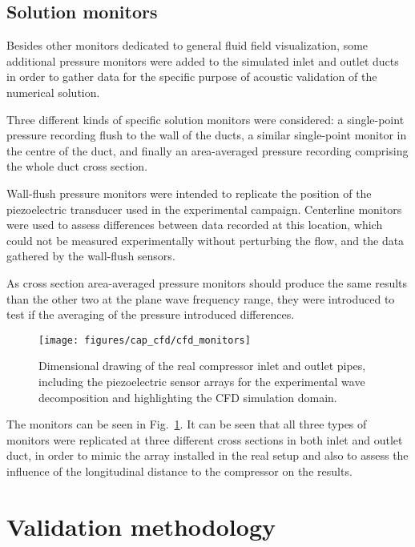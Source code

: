 \subsection{Solution monitors}\label{sub:cfd_sol_monitors}

Besides other monitors dedicated to general fluid field visualization, some additional pressure monitors were added to the simulated inlet and outlet ducts in order to gather data for the specific purpose of acoustic validation of the numerical solution.

Three different kinds of specific solution monitors were considered: a single-point pressure recording flush to the wall of the ducts, a similar single-point monitor in the centre of the duct, and finally an area-averaged pressure recording comprising the whole duct cross section. 

Wall-flush pressure monitors were intended to replicate the position of the piezoelectric transducer used in the experimental campaign. Centerline monitors were used to assess differences between data recorded at this location, which could not be measured experimentally without perturbing the flow, and the data gathered by the wall-flush sensors. 

As cross section area-averaged pressure monitors should produce the same results than the other two at the plane wave frequency range, they were introduced to test if the averaging of the pressure introduced differences.

\begin{figure}
\centering
\texttt{[image: figures/cap\_cfd/cfd\_monitors]}
\caption{Dimensional drawing of the real compressor inlet and outlet pipes, including the piezoelectric sensor arrays for the experimental wave decomposition and highlighting the CFD simulation domain.}
\label{fig:cfd_monitors}
\end{figure}

The monitors can be seen in Fig.~\ref{fig:cfd_monitors}. It can be seen that all three types of monitors were replicated at three different cross sections in both inlet and outlet duct, in order to mimic the array installed in the real setup and also to assess the influence of the longitudinal distance to the compressor on the results. 

\section{Validation methodology} %

